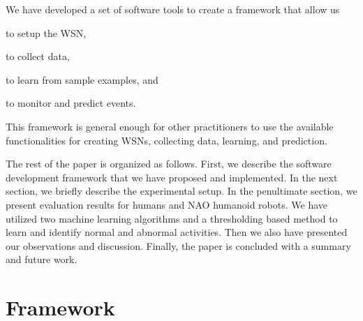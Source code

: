 \documentclass[letterpaper]{article}
\begin{document}
\begin{sloppy}
We have developed a set of software tools to create a framework that allow us
\begin{inparaenum}[1)] \item  to setup the WSN, \item to collect data, \item to learn from sample examples, and \item 
to monitor and predict events. \end{inparaenum} This framework is general enough for other practitioners to use the
available functionalities for creating WSNs, collecting data, learning, and prediction.

The rest of the paper is organized as follows. First, we describe the software development 
framework that we have proposed and implemented. In the next section, we briefly describe the experimental 
setup. In the penultimate section, we present evaluation results for humans and NAO humanoid 
robots. We have utilized two machine learning algorithms and a thresholding based method to learn 
and identify normal and abnormal activities. Then we also have presented our observations and 
discussion. Finally, the paper is concluded with a summary and future work.  


\section{Framework}


\end{sloppy}
\end{document}
